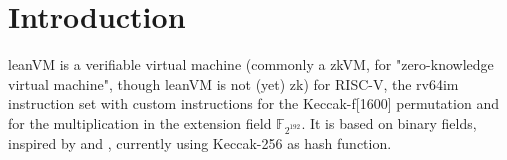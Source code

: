 \section{Introduction}\label{sec:intro}

leanVM is a verifiable virtual machine (commonly a zkVM, for "zero-knowledge virtual machine", though leanVM is not (yet) zk) for RISC-V, the rv64im instruction set \cite{riscv} with custom instructions for the Keccak-f[1600] permutation and for the multiplication in the extension field $\mathbb{F}_{2^{192}}$. It is based on binary fields, inspired by \cite{DP24} and \cite{Flock26}, currently using Keccak-256 as hash function.
